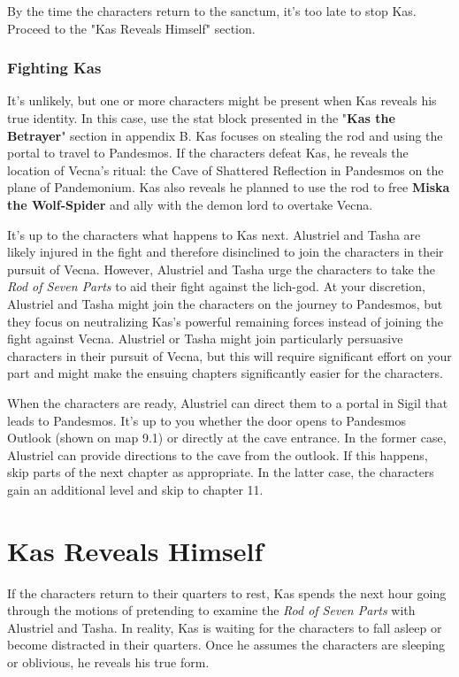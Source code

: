\documentclass[10pt,a4paper,twoside,bg=print,twocolumn,openany,nodeprecatedcode]{dndbook}
\begin{document}
By the time the characters return to the sanctum, it's too late to stop Kas. Proceed to the "Kas Reveals Himself" section.

\subsubsection{Fighting Kas}
It's unlikely, but one or more characters might be present when Kas reveals his true identity. In this case, use the stat block presented in the "\textbf{Kas the Betrayer}" section in appendix B. Kas focuses on stealing the rod and using the portal to travel to Pandesmos. If the characters defeat Kas, he reveals the location of Vecna's ritual: the Cave of Shattered Reflection in Pandesmos on the plane of Pandemonium. Kas also reveals he planned to use the rod to free \textbf{Miska the Wolf-Spider} and ally with the demon lord to overtake Vecna.

It's up to the characters what happens to Kas next. Alustriel and Tasha are likely injured in the fight and therefore disinclined to join the characters in their pursuit of Vecna. However, Alustriel and Tasha urge the characters to take the \textit{Rod of Seven Parts} to aid their fight against the lich-god. At your discretion, Alustriel and Tasha might join the characters on the journey to Pandesmos, but they focus on neutralizing Kas's powerful remaining forces instead of joining the fight against Vecna. Alustriel or Tasha might join particularly persuasive characters in their pursuit of Vecna, but this will require significant effort on your part and might make the ensuing chapters significantly easier for the characters.

When the characters are ready, Alustriel can direct them to a portal in Sigil that leads to Pandesmos. It's up to you whether the door opens to Pandesmos Outlook (shown on map 9.1) or directly at the cave entrance. In the former case, Alustriel can provide directions to the cave from the outlook. If this happens, skip parts of the next chapter as appropriate. In the latter case, the characters gain an additional level and skip to chapter 11.

\section{Kas Reveals Himself}
If the characters return to their quarters to rest, Kas spends the next hour going through the motions of pretending to examine the \textit{Rod of Seven Parts} with Alustriel and Tasha. In reality, Kas is waiting for the characters to fall asleep or become distracted in their quarters. Once he assumes the characters are sleeping or oblivious, he reveals his true form.
\end{document}
